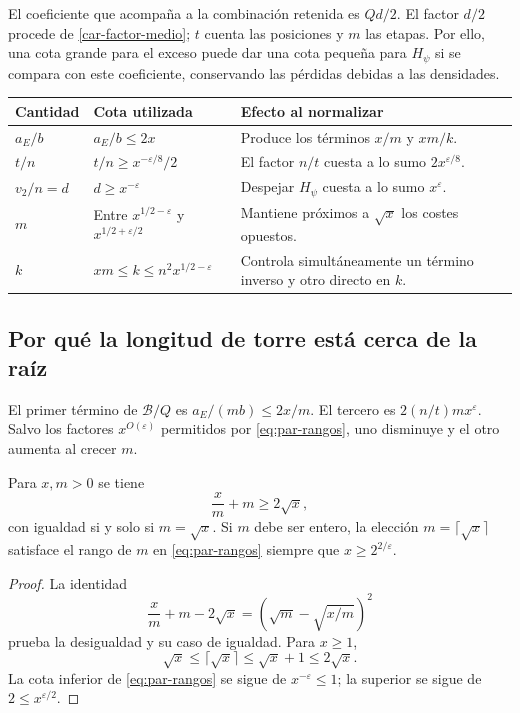El coeficiente que acompaña a la combinación retenida es $Qd/2$.
El factor $d/2$ procede de \eqref{car-factor-medio}; $t$ cuenta las
posiciones y $m$ las etapas. Por ello, una cota grande para el exceso
puede dar una cota pequeña para $H_\psi$ si se compara con este
coeficiente, conservando las pérdidas debidas a las densidades.

\begin{center}
\small
\begin{tabularx}{\textwidth}{@{}p{}YY@{}}
\toprule
\textbf{Cantidad} & \textbf{Cota utilizada} & \textbf{Efecto al normalizar}\\
\midrule
$a_E/b$ & $a_E/b\le2x$ & Produce los términos $x/m$ y $xm/k$.\\
$t/n$ & $t/n\ge x^{-\varepsilon/8}/2$ &
El factor $n/t$ cuesta a lo sumo $2x^{\varepsilon/8}$.\\
$v_2/n=d$ & $d\ge x^{-\varepsilon}$ &
Despejar $H_\psi$ cuesta a lo sumo $x^\varepsilon$.\\
$m$ & Entre $x^{1/2-\varepsilon}$ y $x^{1/2+\varepsilon/2}$ &
Mantiene próximos a $\sqrt{x}$ los costes opuestos.\\
$k$ & $xm\le k\le n^2x^{1/2-\varepsilon}$ &
Controla simultáneamente un término inverso y otro directo en $k$.\\
\bottomrule
\end{tabularx}
\end{center}

\subsection{Por qué la longitud de torre está cerca de la raíz}

El primer término de $\mathcal B/Q$ es $a_E/(mb)\le2x/m$.
El tercero es $2(n/t)mx^\varepsilon$. Salvo los factores
$x^{O(\varepsilon)}$ permitidos por \eqref{eq:par-rangos},
uno disminuye y el otro aumenta al crecer $m$.

\begin{lema}
\label{lem:par-equilibrio}
Para $x,m>0$ se tiene
\[
 \frac xm+m\ge2\sqrt{x},
\]
con igualdad si y solo si $m=\sqrt{x}$. Si $m$ debe ser entero,
la elección $m=\lceil\sqrt{x}\rceil$ satisface el rango de $m$ en
\eqref{eq:par-rangos} siempre que $x\ge2^{2/\varepsilon}$.
\end{lema}

\begin{proof}
La identidad
\[
 \frac xm+m-2\sqrt{x}
   =\left(\sqrt m-\sqrt{x/m}\right)^2
\]
prueba la desigualdad y su caso de igualdad. Para $x\ge1$,
\[
 \sqrt{x}\le\lceil\sqrt{x}\rceil
       \le\sqrt{x}+1\le2\sqrt{x}.
\]
La cota inferior de \eqref{eq:par-rangos} se sigue de
$x^{-\varepsilon}\le1$; la superior se sigue de
$2\le x^{\varepsilon/2}$.
\end{proof}


